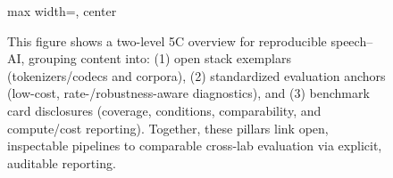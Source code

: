 \begin{figure}[h]
\begin{adjustbox}{max width=\textwidth, center}
\end{adjustbox}

\caption{This figure shows a two-level 5C overview for reproducible speech–AI, grouping content into: (1) open stack exemplars (tokenizers/codecs and corpora), (2) standardized evaluation anchors (low-cost, rate-/robustness-aware diagnostics), and (3) benchmark card disclosures (coverage, conditions, comparability, and compute/cost reporting). Together, these pillars link open, inspectable pipelines to comparable cross-lab evaluation via explicit, auditable reporting.}
\label{fig:tiny_tree_figure_12}

\end{figure}